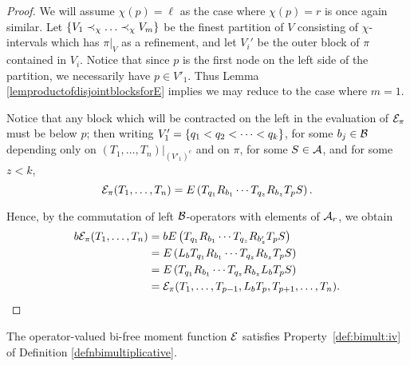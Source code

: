 		\begin{proof}
			We will assume $\chi(p) = \ell$ as the case where $\chi(p) = r$ is once again similar.
			Let $\left\{V_1 \prec_\chi \ldots \prec_\chi V_m\right\}$ be the finest partition of $V$ consisting of $\chi$-intervals which has $\pi|_V$ as a refinement, and let $V_i'$ be the outer block of $\pi$ contained in $V_i$.
			Notice that since $p$ is the first node on the left side of the partition, we necessarily have $p \in V'_1$.
			Thus Lemma \ref{lemproductofdisjointblocksforE} implies we may reduce to the case where $m = 1$.



			Notice that any block which will be contracted on the left in the evaluation of $\mathcal{E}_\pi$ must be below $p$; then writing $V_1' = \left\{q_1 < q_2 < \cdots < q_{k}\right\}$, for some $b_j \in \mathcal{B}$ depending only on $(T_1, \ldots, T_n)|_{(V'_1)^c}$ and on $\pi$, for some $S \in \mathcal{A}$, and for some $z < k$,
			\[
				\mathcal{E}_\pi(T_1, \ldots, T_n) = E\left( T_{q_1} R_{b_1}
				\cdots T_{q_z} R_{b_z} T_p S\right).
			\]

			Hence, by the commutation of left $\mathcal{B}$-operators with elements of $\mathcal{A}_r$, we obtain
			\begin{align*}
				b\mathcal{E}_\pi(T_1, \ldots, T_n) & =bE\left( T_{q_1} R_{b_1}
				\cdots T_{q_z} R_{b'_z} T_p S\right)\\
				& =E\left(L_bT_{q_1} R_{b_1}
				\cdots T_{q_z} R_{b_z} T_p S\right)\\
				& = E\left( T_{q_1} R_{b_1}
				\cdots T_{q_z} R_{b_z} L_bT_p S\right)\\
				& = \mathcal{E}_\pi(T_1, \ldots, T_{p-1}, L_b T_p, T_{p+1}, \ldots, T_n).
				\qedhere
			\end{align*}
		\end{proof}

		\begin{lemma}
			\label{lemfullreductionofproductsinvolvingblocksinsideblocks}
			The operator-valued bi-free moment function $\mathcal{E}$ satisfies Property~\ref{def:bimult:iv} of Definition \ref{defnbimultiplicative}.
		\end{lemma}

